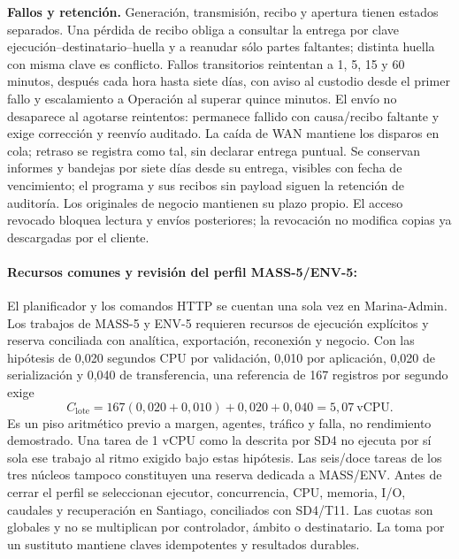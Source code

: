 \textbf{Fallos y retención.} Generación, transmisión, recibo y apertura tienen estados separados. Una pérdida de recibo obliga a consultar la entrega por clave ejecución--destinatario--huella y a reanudar sólo partes faltantes; distinta huella con misma clave es conflicto. Fallos transitorios reintentan a 1, 5, 15 y 60 minutos, después cada hora hasta siete días, con aviso al custodio desde el primer fallo y escalamiento a Operación al superar quince minutos. El envío no desaparece al agotarse reintentos: permanece fallido con causa/recibo faltante y exige corrección y reenvío auditado. La caída de WAN mantiene los disparos en cola; retraso se registra como tal, sin declarar entrega puntual. Se conservan informes y bandejas por siete días desde su entrega, visibles con fecha de vencimiento; el programa y sus recibos sin payload siguen la retención de auditoría. Los originales de negocio mantienen su plazo propio. El acceso revocado bloquea lectura y envíos posteriores; la revocación no modifica copias ya descargadas por el cliente.

\label{subsec:sd5_env5_recursos}
\paragraph{Recursos comunes y revisión del perfil MASS-5/ENV-5:}
El planificador y los comandos HTTP se cuentan una sola vez en Marina-Admin. Los trabajos de MASS-5 y ENV-5 requieren recursos de ejecución explícitos y reserva conciliada con analítica, exportación, reconexión y negocio. Con las hipótesis de 0,020 segundos CPU por validación, 0,010 por aplicación, 0,020 de serialización y 0,040 de transferencia, una referencia de 167 registros por segundo exige
\[
C_{\mathrm{lote}}=167(0{,}020+0{,}010)+0{,}020+0{,}040=5{,}07\ \mathrm{vCPU}.
\]
Es un piso aritmético previo a margen, agentes, tráfico y falla, no rendimiento demostrado. Una tarea de 1 vCPU como la descrita por SD4 no ejecuta por sí sola ese trabajo al ritmo exigido bajo estas hipótesis. Las seis/doce tareas de los tres núcleos tampoco constituyen una reserva dedicada a MASS/ENV. Antes de cerrar el perfil se seleccionan ejecutor, concurrencia, CPU, memoria, I/O, caudales y recuperación en Santiago, conciliados con SD4/T11. Las cuotas son globales y no se multiplican por controlador, ámbito o destinatario. La toma por un sustituto mantiene claves idempotentes y resultados durables.

